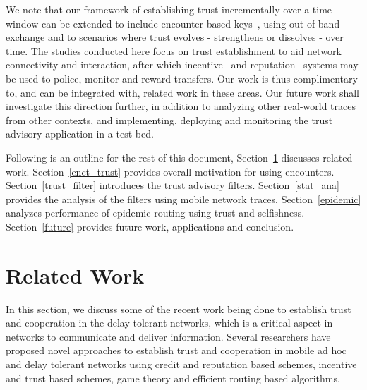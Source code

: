 \documentclass[10pt,conference]{IEEEtran}
\begin{document}
We note that our framework of establishing trust incrementally over a time window can be extended to include encounter-based keys~\cite{gangs,smile},  using out of band exchange and to scenarios where trust evolves - strengthens or dissolves - over time. The studies conducted here focus on trust establishment to aid network connectivity and interaction, after which incentive~\cite{sprite,nuglets} and reputation~\cite{reputation} systems may be used to police, monitor and reward transfers. Our work is thus complimentary to, and can be integrated with, related work in these areas. Our future work shall investigate this direction further, in addition to analyzing other real-world traces from other contexts, and implementing, deploying and monitoring the trust advisory application in a test-bed.

Following is an outline for the rest of this document, Section~\ref{rel_work} discusses related work. Section~\ref{enct_trust} provides overall motivation for using encounters. Section~\ref{trust_filter} introduces the trust advisory filters. Section~\ref{stat_ana} provides the analysis of the filters using mobile network traces. Section~\ref{epidemic} analyzes performance of epidemic routing using trust and selfishness. Section~\ref{future} provides future work, applications and conclusion.





\section{Related Work} \label{rel_work}


In this section, we discuss some of the recent work being done to establish trust and cooperation in the delay tolerant networks, which is a critical aspect in networks to communicate and deliver information. Several researchers have proposed novel approaches to establish trust and cooperation in mobile ad hoc and delay tolerant networks using credit and reputation based schemes, incentive and trust based schemes, game theory and efficient routing based algorithms. 
\end{document}
